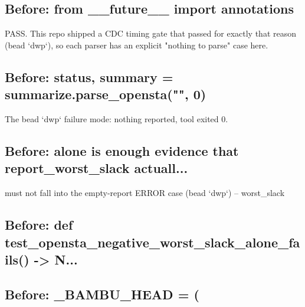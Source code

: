 \begin{record}

\subsection*{Before: from \_\_future\_\_ import annotations}

\begin{textblock}
PASS. This repo shipped a CDC timing gate that passed for exactly that reason
(bead `dwp`), so each parser has an explicit "nothing to parse" case here.
\end{textblock}

\subsection*{Before: status, summary = summarize.parse\_opensta("", 0)}

\begin{textblock}
The bead `dwp` failure mode: nothing reported, tool exited 0.
\end{textblock}

\subsection*{Before: alone is enough evidence that report\_worst\_slack actuall...}

\begin{textblock}
must not fall into the empty-report ERROR case (bead `dwp`) -- worst_slack
\end{textblock}

\subsection*{Before: def test\_opensta\_negative\_worst\_slack\_alone\_fails() -> N...}


\subsection*{Before: \_BAMBU\_HEAD = (}



\end{record}
